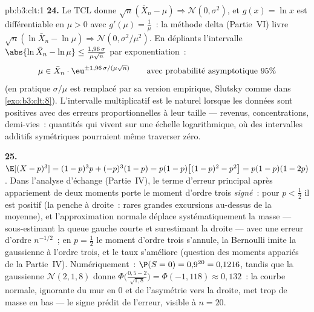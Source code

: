 \begin{solution}{pb:b3:clt:1}
\textbf{24.} Le TCL donne $\sqrt n(\bar X_n - \mu)
\Rightarrow \mathcal N(0, \sigma^2)$, et $g(x) = \ln x$ est
différentiable en $\mu > 0$ avec $g'(\mu) = \frac1\mu$~: la
méthode delta (Partie~VI) livre $\sqrt n(\ln\bar X_n -
\ln\mu) \Rightarrow \mathcal N(0, \sigma^2/\mu^2)$. En
dépliants l'intervalle $\abs{\ln\bar X_n - \ln\mu} \leq
\frac{1{,}96\,\sigma}{\mu\sqrt n}$ par exponentiation~:
\[
\mu \in \bar X_n\cdot
\eu^{\pm1{,}96\,\sigma/(\mu\sqrt n)}
\qquad\text{avec probabilité asymptotique } 95\%
\]
(en pratique $\sigma/\mu$ est remplacé par sa version
empirique, Slutsky comme dans \cref{exo:b3:clt:8}).
L'intervalle multiplicatif est le naturel lorsque les
données sont positives avec des erreurs proportionnelles à
leur taille --- revenus, concentrations, demi-vies~:
quantités qui vivent sur une échelle logarithmique, où des
intervalles additifs symétriques pourraient même traverser
zéro.

\textbf{25.} $\E[(X - p)^3] = (1-p)^3p + (-p)^3(1 - p) =
p(1-p)\bigl[(1-p)^2 - p^2\bigr] = p(1-p)(1 - 2p)$. Dans
l'analyse d'échange (Partie~IV), le terme d'erreur principal
après appariement de deux moments porte le moment d'ordre
trois \emph{signé}~: pour $p < \frac12$ il est positif (la
 penche à droite~: rares grandes excursions au-dessus de
la moyenne), et l'approximation normale déplace
systématiquement la masse --- sous-estimant la queue gauche
courte et surestimant la droite --- avec une erreur d'ordre
$n^{-1/2}$~; en $p = \frac12$ le moment d'ordre trois
s'annule, la Bernoulli imite la gaussienne à l'ordre trois,
et le taux s'améliore (question des moments appariés de la
Partie~IV). Numériquement~: $\P(S = 0) = 0{,}9^{20} =
0{,}1216$, tandis que la gaussienne $\mathcal N(2, 1{,}8)$
donne $\Phi\bigl(\frac{0{,}5 - 2}{\sqrt{1{,}8}}\bigr) =
\Phi(-1{,}118) \approx 0{,}132$~: la courbe normale,
ignorante du mur en $0$ et de l'asymétrie vers la droite,
met trop de masse en bas --- le signe prédit de l'erreur,
visible à $n = 20$.
\end{solution}
